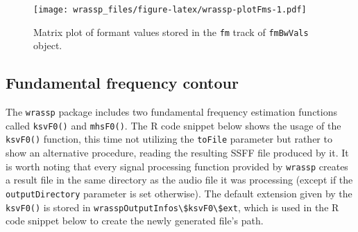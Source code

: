 \documentclass[]{book}
\newenvironment{Shaded}{\begin{snugshade}}{\end{snugshade}}
\newcommand{\CommentTok}[1]{\textcolor[rgb]{0.56,0.35,0.01}{\textit{#1}}}
\newcommand{\DataTypeTok}[1]{\textcolor[rgb]{0.13,0.29,0.53}{#1}}
\newcommand{\DecValTok}[1]{\textcolor[rgb]{0.00,0.00,0.81}{#1}}
\newcommand{\KeywordTok}[1]{\textcolor[rgb]{0.13,0.29,0.53}{\textbf{#1}}}
\newcommand{\NormalTok}[1]{#1}
\newcommand{\OperatorTok}[1]{\textcolor[rgb]{0.81,0.36,0.00}{\textbf{#1}}}
\newcommand{\StringTok}[1]{\textcolor[rgb]{0.31,0.60,0.02}{#1}}
\begin{document}
\begin{Shaded}
\end{Shaded}

\begin{figure}
\centering
\texttt{[image: wrassp\_files/figure-latex/wrassp-plotFms-1.pdf]}
\caption{\label{fig:wrassp-plotFms}Matrix plot of formant values stored in the \texttt{fm} track of \texttt{fmBwVals} object.}
\end{figure}

\hypertarget{subsec:wrassp_f0}{%
\subsection{Fundamental frequency contour}\label{subsec:wrassp_f0}}

The \texttt{wrassp} package includes two fundamental frequency estimation functions called \texttt{ksvF0()} and \texttt{mhsF0()}. The R code snippet below shows the usage of the \texttt{ksvF0()} function, this time not utilizing the \texttt{toFile} parameter but rather to show an alternative procedure, reading the resulting SSFF file produced by it. It is worth noting that every signal processing function provided by \texttt{wrassp} creates a result file in the same directory as the audio file it was processing (except if the \texttt{outputDirectory} parameter is set otherwise). The default extension given by the \texttt{ksvF0()} is stored in \texttt{wrasspOutputInfos\textbackslash{}\$ksvF0\textbackslash{}\$ext}, which is used in the R code snippet below to create the newly generated file's path.
\end{document}
